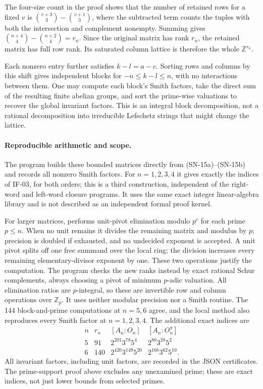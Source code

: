 The four-size count in the proof shows that the number of retained
rows for a fixed $v$ is
$\binom{v+3}{3}-\binom{v+1}{3}$, where the subtracted term counts
the tuples with both the intersection and complement nonempty.
Summing gives
$\binom{n+4}{4}-\binom{n+2}{4}=r_n$. Since the original matrix
has rank $r_n$, the retained matrix has full row rank. Its
saturated column lattice is therefore the whole $\mathbb Z^{r_n}$.

Each nonzero entry further satisfies $k-l=a-c$. Sorting rows and
columns by this shift gives independent blocks for
$-n\le k-l\le n$, with no interactions between them. One may
compute each block's Smith factors, take the direct sum of the
resulting finite abelian groups, and sort the prime-wise valuations
to recover the global invariant factors. This is an integral block
decomposition, not a rational decomposition into irreducible
Lefschetz strings that might change the lattice.

\paragraph{Reproducible arithmetic and scope.}
The program  builds these
bounded matrices directly from (SN-15a)--(SN-15b) and records all
nonzero Smith factors. For $n=1,2,3,4$ it gives exactly the
indices of IF-03, for both orders; this is a third construction,
independent of the right-word and left-word closure programs.
It uses the same exact integer linear-algebra library and is
not described as an independent formal proof kernel.

For larger matrices,  performs
unit-pivot elimination modulo $p^c$ for each prime $p\le n$.
When no unit remains it divides the remaining matrix and modulus by
$p$; precision is doubled if exhausted, and no undecided exponent is
accepted. A unit pivot splits off one free summand over the local
ring; the division increases every remaining elementary-divisor
exponent by one. These two operations justify the computation.
The program  checks the
new ranks instead by exact rational Schur complements, always
choosing a pivot of minimum $p$-adic valuation. All elimination
ratios are $p$-integral, so these are invertible row and column
operations over $\mathbb Z_p$. It uses neither modular precision
nor a Smith routine. The 144 block-and-prime computations at
$n=5,6$ agree, and the local method also reproduces every Smith
factor at $n=1,2,3,4$. The additional exact indices are
\[
\begin{array}{c|c|c|c}
n&r_n&[A_n:O_n]&[A_n:O_n^\pi]\\\hline
5&91&2^{201}3^{78}5^4&2^{80}3^{28}5^2\\
6&140&2^{420}3^{149}5^{20}&2^{168}3^{62}5^{10}.
\end{array}                                      \tag{SN-15g}
\]
All invariant factors, including unit factors, are recorded in the
JSON certificates. The prime-support proof above excludes any
unexamined prime; these are exact indices, not just lower bounds
from selected primes.

